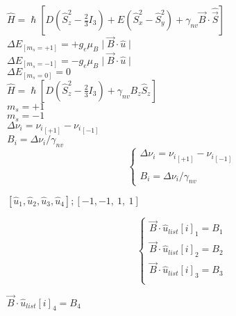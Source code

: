 \documentclass{report}
\begin{document}
     $\hat{H} = \hslash [ D (\hat{S}_z^2 - \frac{2}{3} I_3) + E (\hat{S}_x^2 - \hat{S}_y^2) + \gamma_{nv} \vec{B} \cdot \hat{\vec{S}} ]$\\
     $\Delta E_{[m_s = +1]} = + g_e \mu_B \mid \vec{B} \cdot \hat{u} \mid$ \\
     $\Delta E_{[m_s = -1]} = - g_e \mu_B \mid\vec{B} \cdot \hat{u} \mid$ \\
     $\Delta E_{[m_s = 0]} = 0$ \\
     $\hat{H} = \hslash [ D (\hat{S}_z^2 - \frac{2}{3} I_3) + \gamma_{nv} B_z \hat{S}_z ]$\\
     $m_s = +1$ \\
     $m_s = -1$ \\
     $\Delta \nu_i = {\nu_i}_{[+1]} - {\nu_i}_{[-1]} $ \\
     $B_i = \Delta \nu_i / \gamma_{nv} $ \\
     \begin{equation}
      \begin{cases}
        \Delta \nu_i = {\nu_i}_{[+1]} - {\nu_i}_{[-1]} \\ \\
        B_i = \Delta \nu_i / \gamma_{nv} 
      \end{cases}  
     \end{equation}
      
    $[\hat{u}_1,\hat{u}_2,\hat{u}_3,\hat{u}_4];[-1,-1, \ 1, \ 1]$

     \begin{equation}
      \begin{cases}
        \vec{B} \cdot \hat{u}_{list}[i]_1 = B_1 \\
        \vec{B} \cdot \hat{u}_{list}[i]_2 = B_2 \\
        \vec{B} \cdot \hat{u}_{list}[i]_3 = B_3 \\
      \end{cases}  
     \end{equation}

    $\vec{B} \cdot \hat{u}_{list}[i]_4 = B_4$ \\
\end{document}
